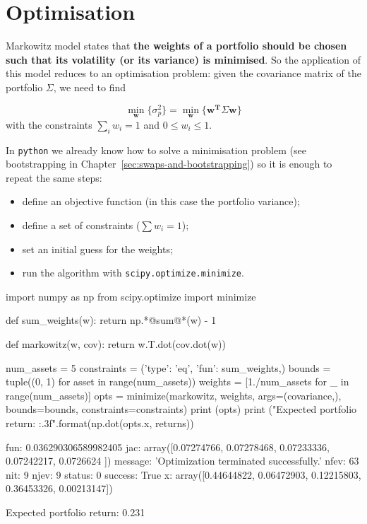 \section{Optimisation}\label{optimization}

Markowitz model states that \textbf{the weights of a portfolio should be chosen such that its volatility (or its variance) is minimised}. 
So the application of this model reduces to an optimisation problem: given the covariance matrix of the portfolio $\Sigma$, we need to find

\begin{equation}
	\underset{\mathbf{w}}{\min}\{\sigma_p^2\} = \underset{\mathbf{w}}{\min}\{\mathbf{w^T}\Sigma\mathbf{w}\}
\end{equation}
with the constraints \(\sum_{i}w_i = 1\) and \(0 \le w_i \le 1\).

In \texttt{python} we already know how to solve a minimisation problem
(see bootstrapping in Chapter~\ref{sec:swaps-and-bootstrapping}) 
so it is enough to repeat the same steps:

\begin{itemize}
\tightlist
\item   define an objective function (in this case the portfolio variance);
\item define a set of constraints ($\sum w_i = 1$);
\item set an initial guess for the weights;
\item run the algorithm with \texttt{scipy.optimize.minimize}.
\end{itemize}

\begin{ipython}
import numpy as np
from scipy.optimize import minimize

def sum_weights(w):
    return np.*@sum@*(w) - 1

def markowitz(w, cov):
    return w.T.dot(cov.dot(w))

num_assets = 5
constraints = ({'type': 'eq', 'fun': sum_weights},)
bounds = tuple((0, 1) for asset in range(num_assets))
weights = [1./num_assets for _ in range(num_assets)]
opts = minimize(markowitz, weights, args=(covariance,),
                bounds=bounds, constraints=constraints)
print (opts)
print ("Expected portfolio return: {:.3f}".format(np.dot(opts.x, returns))
\end{ipython}
\begin{ioutput}
    fun: 0.036290306589982405
    jac: array([0.07274766, 0.07278468, 0.07233336, 0.07242217, 0.0726624 ])
message: 'Optimization terminated successfully.'
   nfev: 63
    nit: 9
   njev: 9
 status: 0
success: True
x: array([0.44644822, 0.06472903, 0.12215803, 0.36453326, 0.00213147])

Expected portfolio return: 0.231
\end{ioutput}

